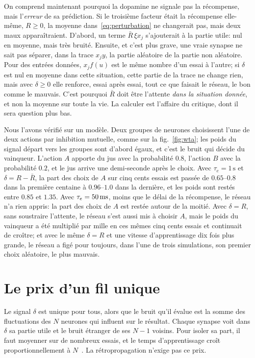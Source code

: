 On comprend maintenant pourquoi la dopamine ne signale pas la récompense, mais l'\emph{erreur} de sa prédiction. Si le troisième facteur était la récompense elle-même, $R\ge0$, la moyenne dans~\eqref{eq:perturbation} ne changerait pas, mais deux maux apparaîtraient. D'abord, un terme $\bar R\,\xi x_j$ s'ajouterait à la partie utile: nul en moyenne, mais très bruité. Ensuite, et c'est plus grave, une vraie synapse ne sait pas séparer, dans la trace $x_jy$, la partie aléatoire de la partie non aléatoire. Pour des entrées données, $x_jf(u)$ est le même nombre d'un essai à l'autre; si $\delta$ est nul en moyenne dans cette situation, cette partie de la trace ne change rien, mais avec $\delta\ge0$ elle renforce, essai après essai, tout ce que faisait le réseau, le bon comme le mauvais. C'est pourquoi $\bar R$ doit être l'attente \emph{dans la situation donnée}, et non la moyenne sur toute la vie. La calculer est l'affaire du critique, dont il sera question plus bas.

Nous l'avons vérifié sur un modèle. Deux groupes de neurones  choisissent l'une de deux actions par inhibition mutuelle, comme sur la fig.~\ref{fig:wta}; les poids du signal \og départ\fg{} vers les groupes sont d'abord égaux, et c'est le bruit qui décide du vainqueur. L'action $A$ apporte du jus avec la probabilité $0.8$, l'action $B$ avec la probabilité $0.2$, et le jus arrive une demi-seconde après le choix. Avec $\tau_e=1\,\text{s}$ et $\delta=R-\bar R$, la part des choix de $A$ sur cinq cents essais est passée de $0.65$--$0.8$ dans la première centaine à $0.96$--$1.0$ dans la dernière, et les poids sont restés entre $0.85$ et $1.35$. Avec $\tau_e=50\,\text{ms}$, moins que le délai de la récompense, le réseau n'a rien appris: la part des choix de $A$ est restée autour de la moitié. Avec $\delta=R$, sans soustraire l'attente, le réseau s'est aussi mis à choisir $A$, mais le poids du vainqueur a été multiplié par mille en ces mêmes cinq cents essais et continuait de croître; et avec le même $\delta=R$ et une vitesse d'apprentissage dix fois plus grande, le réseau a figé pour toujours, dans l'une de trois simulations, son premier choix aléatoire, le plus mauvais.

\section{Le prix d'un fil unique}

Le signal $\delta$ est unique pour tous, alors que le bruit qu'il évalue est la somme des fluctuations des $N$ neurones qui influent sur le résultat. Chaque synapse voit dans $\delta$ sa partie utile et le bruit étranger de ses $N-1$ voisins. Pour isoler sa part, il faut moyenner sur de nombreux essais, et le temps d'apprentissage croît proportionnellement à $N$~\cite{Werfel2005}. La rétropropagation n'exige pas ce prix.


